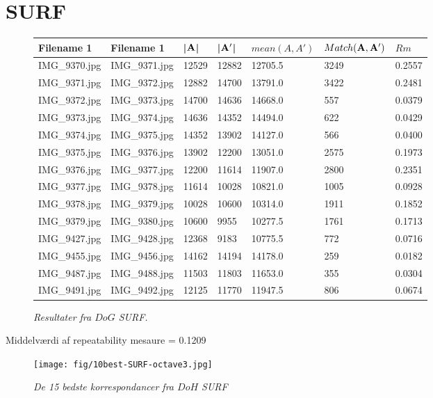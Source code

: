 \section{SURF}
\begin{figure}[H]
    \centering
    \begin{center}    
    \begin{tabular}{ | l | l | l | l | l | l | l |}
    \hline
    Filename 1 & Filename 1 & |$\bold{A}$| & |$\bold{A'}$| & $mean(A,A')$ & $Match(\bold{A}, \bold{A}')$ & $Rm$ \\ \hline
IMG\_9370.jpg &	IMG\_9371.jpg &	12529 &	12882 &	12705.5 &	3249 &	0.2557\\ \hline
IMG\_9371.jpg &	IMG\_9372.jpg &	12882 &	14700 &	13791.0 &	3422 &	0.2481\\ \hline
IMG\_9372.jpg &	IMG\_9373.jpg &	14700 &	14636 &	14668.0 &	557 &	0.0379\\ \hline
IMG\_9373.jpg &	IMG\_9374.jpg &	14636 &	14352 &	14494.0 &	622 &	0.0429\\ \hline
IMG\_9374.jpg &	IMG\_9375.jpg &	14352 &	13902 &	14127.0 &	566 &	0.0400\\ \hline
IMG\_9375.jpg &	IMG\_9376.jpg &	13902 &	12200 &	13051.0 &	2575 &	0.1973\\ \hline
IMG\_9376.jpg &	IMG\_9377.jpg &	12200 &	11614 &	11907.0 &	2800 &	0.2351\\ \hline
IMG\_9377.jpg &	IMG\_9378.jpg &	11614 &	10028 &	10821.0 &	1005 &	0.0928\\ \hline
IMG\_9378.jpg &	IMG\_9379.jpg &	10028 &	10600 &	10314.0 &	1911 &	0.1852\\ \hline
IMG\_9379.jpg &	IMG\_9380.jpg &	10600 &	9955 &	10277.5 &	1761 &	0.1713\\ \hline
IMG\_9427.jpg &	IMG\_9428.jpg &	12368 &	9183 &	10775.5 &	772 &	0.0716\\ \hline
IMG\_9455.jpg &	IMG\_9456.jpg &	14162 &	14194 &	14178.0 &	259 &	0.0182\\ \hline
IMG\_9487.jpg &	IMG\_9488.jpg &	11503 &	11803 &	11653.0 &	355 &	0.0304\\ \hline
IMG\_9491.jpg &	IMG\_9492.jpg &	12125 &	11770 &	11947.5 &	806 &	0.0674\\ \hline
    \end{tabular}       
    \caption{{\footnotesize \textit{Resultater fra $DoG$ SURF.}}}
    \label{tab:SURFOCTAVE3}
     \end{center}
     \vspace{-2.5em}
\end{figure} \noindent
Middelværdi af repeatability mesaure = 0.1209
\begin{figure}[H]
    \centering
    \texttt{[image: fig/10best-SURF-octave3.jpg]}
    \vspace{-0.5em}   
    \begin{center}
    \caption{{\footnotesize \textit{
    De 15 bedste korrespondancer fra $DoH$ SURF}}}
    \label{fig:lindblob}
     \end{center}
  \end{figure}
       \vspace{-2.7em}
\noindent

